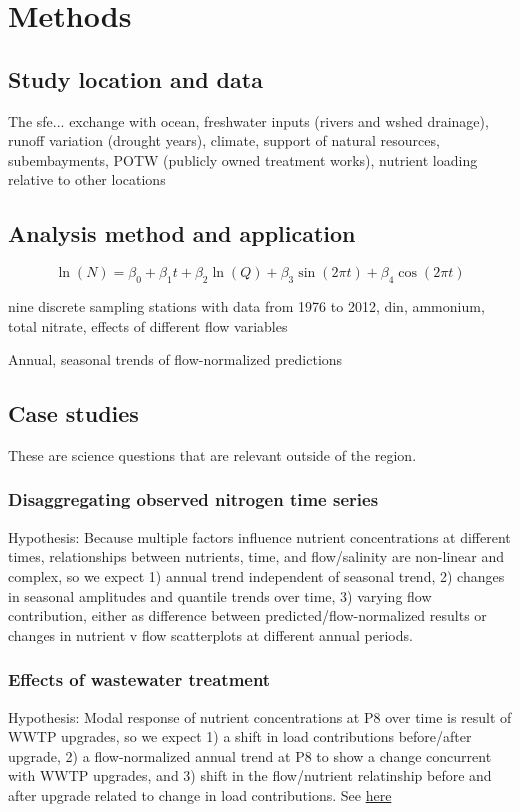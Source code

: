 \documentclass[letterpaper,12pt,oneside]{article}\usepackage[]{graphicx}\usepackage[]{color}
\begin{document}
\section{Methods}

\subsection{Study location and data}



The \ac{sfe}... exchange with ocean, freshwater inputs (rivers and wshed drainage), runoff variation (drought years), climate, support of natural resources, subembayments, POTW (publicly owned treatment works), nutrient loading relative to other locations
\subsection{Analysis method and application}

\begin{equation}
\ln\left(N\right) = \beta_0 + \beta_1 t + \beta_2 \ln\left(Q\right) + \beta_3 \sin\left(2\pi t\right) + \beta_4 \cos\left(2\pi t\right)
\end{equation}

nine discrete sampling stations with data from 1976 to 2012, \ac{din}, ammonium, total nitrate, effects of different flow variables

Annual, seasonal trends of flow-normalized predictions

\subsection{Case studies}
These are science questions that are relevant outside of the region.
\subsubsection{Disaggregating observed nitrogen time series}
Hypothesis: Because multiple factors influence nutrient concentrations at different times, relationships between nutrients, time, and flow/salinity are non-linear and complex, so we expect 1) annual trend independent of seasonal trend, 2) changes in seasonal amplitudes and quantile trends over time, 3) varying flow contribution, either as difference between predicted/flow-normalized results or changes in nutrient v flow scatterplots at different annual periods.
\subsubsection{Effects of wastewater treatment}
Hypothesis: Modal response of nutrient concentrations at P8 over time is result of WWTP upgrades, so we expect 1) a shift in load contributions before/after upgrade, 2) a flow-normalized annual trend at P8 to show a change concurrent with WWTP upgrades, and 3) shift in the flow/nutrient relatinship before and after upgrade related to change in load contributions. See \href{http://www.waterboards.ca.gov/centralvalley/board_decisions/adopted_orders/san_joaquin/r5-2008-0086_res.pdf}{here}
\end{document}

